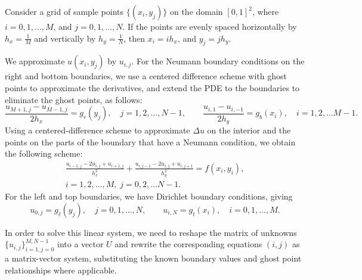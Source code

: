 \documentclass{homework}
\begin{document}
	\begin{alphaparts}
		\questionpart Consider a grid of sample points $\{(x_i, y_j)\}$ on the domain $[0,1]^2$, where $i = 0,1,\dots, M$, and $j = 0,1,\dots, N$. If the points are evenly spaced horizontally by $h_x = \frac{1}{M}$ and vertically by $h_y = \frac{1}{N}$, then $x_i = ih_x$, and $y_j = jh_y$.
		
		We approximate $u(x_i,y_j)$ by $u_{i,j}$. For the Neumann boundary conditions on the right and bottom boundaries, we use a centered difference scheme with ghost points to approximate the derivatives, and extend the PDE to the boundaries to eliminate the ghost points, as follows:
		\begin{equation*}
			\frac{u_{M+1,j} - u_{M-1,j}}{2h_x} = g_r(y_j), \quad j = 1,2,\dots, N-1, \qquad \frac{u_{i,1}-u_{i,-1}}{2h_y} = g_b(x_i), \quad i=1,2,\dots M-1.
		\end{equation*}
		Using a centered-difference scheme to approximate $\Delta u$ on the interior and the points on the parts of the boundary that have a Neumann condition, we obtain the following scheme:
		\begin{equation*}
			\tag{$i,j$}
			\begin{split}
				\frac{u_{i-1,j} - 2u_{i,j} + u_{i+1,j}}{h_x^2} + \frac{u_{i,j-1} -2 u_{i,j} + u_{i,j+1}}{h_y^2} = f(x_i, y_i),\\  i=1,2,\dots, M,\; j=0,2,\dots N-1.
			\end{split}
		\end{equation*}
		For the left and top boundaries, we have Dirichlet boundary conditions, giving
		\begin{equation*}
			u_{0,j} = g_\ell(y_j), \quad j = 0,1,\dots, N, \qquad u_{i,N} = g_t(x_i), \quad i=0,1,\dots, M.
		\end{equation*}
		
		In order to solve this linear system, we need to reshape the matrix of unknowns $\{u_{i,j}\}_{i=1,j=0}^{M,N-1}$ into a vector $U$ and rewrite the corresponding equations $(i,j)$ as a matrix-vector system, substituting the known boundary values and ghost point relationships where applicable.
		

\end{alphaparts}
\end{document}

